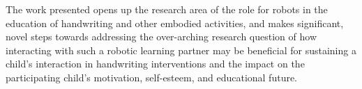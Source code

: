 \documentclass{sig-alternate}
\begin{document}
The work presented opens up the research area of the role for robots in the
education of handwriting and other embodied activities, and makes significant,
novel steps towards addressing the over-arching research question of how
interacting with such a robotic learning partner may be beneficial for
sustaining a child's interaction in handwriting interventions and the impact on
the participating child's motivation, self-esteem, and educational future.






\end{document}
